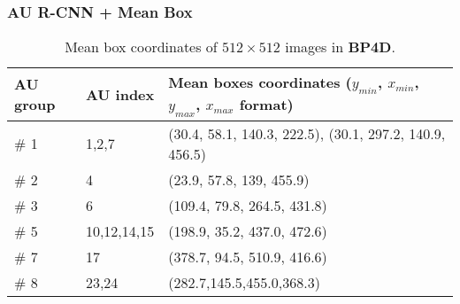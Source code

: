 \documentclass[5p,twocolumn]{elsarticle}
\begin{document}
\subsubsection{AU R-CNN + Mean Box}
\label{sec:mean_box}
\begin{table}[htp]
	\scriptsize	
	\setlength{\abovecaptionskip}{0pt} 
	\caption{Mean box coordinates of $512\times 512$ images in \textbf{BP4D}.}
	\label{tab:BP4D_mean_box}
	\centering
	\tabcolsep=0.05cm
	\begin{tabular}{lll}
		\toprule
		
		AU group & AU index & Mean boxes coordinates ($y_{min}$, $x_{min}$, $y_{max}$, $x_{max}$ format) \\
		\midrule
		\# 1 & 1,2,7 & (30.4, 58.1, 140.3, 222.5), (30.1, 297.2, 140.9, 456.5)  \\
		\# 2 & 4 & (23.9, 57.8, 139, 455.9) \\
		\# 3 & 6 & (109.4, 79.8, 264.5, 431.8) \\
		\# 5 & 10,12,14,15 & (198.9, 35.2, 437.0, 472.6) \\
		\# 7 & 17 & (378.7, 94.5, 510.9, 416.6) \\
		\# 8 & 23,24 & (282.7,145.5,455.0,368.3) \\
		\bottomrule
	\end{tabular}
	\vspace{-0.0cm}
\end{table}
\end{document}
